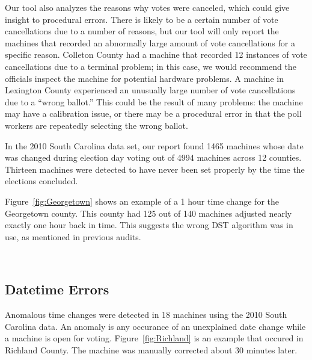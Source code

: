 Our tool also analyzes the reasons why votes were canceled, which
could give insight to procedural errors.  There is likely to be a
certain number of vote cancellations due to a number of reasons, but
our tool will only report the machines that recorded an abnormally
large amount of vote cancellations for a specific reason.  Colleton
County had a machine that recorded 12 instances of vote cancellations
due to a terminal problem; in this case, we would recommend the
officials inspect the machine for potential hardware problems.  A
machine in Lexington County experienced an unusually large number of
vote cancellations due to a \textquotedblleft wrong ballot.'' This
could be the result of many problems: the machine may have a
calibration issue, or there may be a procedural error in that the poll
workers are repeatedly selecting the wrong ballot.

In the 2010 South Carolina data set, our report found 1465 machines
whose date 
was changed during election day voting out of 4994 machines across 12
counties. Thirteen  machines were detected to
have never been set properly by the time the elections concluded.

Figure~\ref{fig:Georgetown} shows an example of a 1 hour time change for the
Georgetown county.  This county had 125 out of 140 machines adjusted nearly
exactly one hour back in time.  This suggests the wrong DST
algorithm was in use, as mentioned in previous audits.~\cite{Buell2011}

\begin{figure}[h]
\centering
\mbox{
}
\end{figure}





\smvertspace
\subsection{Datetime Errors}
Anomalous time changes were detected in 18 machines using the 2010 South
Carolina data.  An anomaly is any occurance of an unexplained date
change while a machine is open for voting. Figure~\ref{fig:Richland}
is an example that occured in Richland County.  The machine was manually
corrected about 30 minutes later. 

